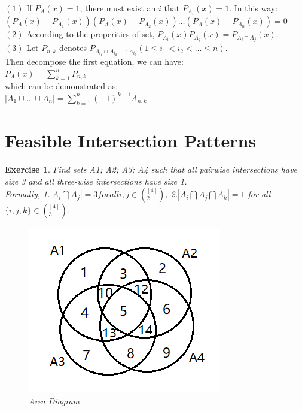 \documentclass[12pt,a4]{article}
\theoremstyle{exercise}
\newtheorem{exercise}[theorem]{Exercise}
\begin{document}
\begin{enumerate}
    $(1)$ If $P_A(x) = 1$, there must exist an $i$ that $P_{A_i}(x) = 1$. In this way:\\
    $(P_A(x) - P_{A_1}(x))(P_A(x) - P_{A_2}(x))\ldots(P_A(x) - P_{A_n}(x)) = 0$\\

    $(2)$ According to the properities of set, $P_{A_i}(x)P_{A_j}(x) = P_{A_i \cap A_j}(x)$.\\

    $(3)$ Let $P_{n,k}$ denotes $P_{A_{i_1}\cap A_{i_2}\ldots\cap A_{i_k}}(1\le i_1<i_2<\ldots\le n)$.\\
    Then decompose the first equation, we can have:\\
    $P_A(x) = \sum\limits_{k=1}^{n}P_{n,k}$\\
    which can be demonstrated as:\\
     $\left\vert{A_1\cup\ldots\cup A_n}\right\vert = \sum\limits_{k=1}^{n}(-1)^{k+1}A_{n,k}$\\
\end{enumerate}

\section{Feasible Intersection Patterns}


\begin{exercise}  Find sets A1; A2; A3; A4 such that all pairwise intersections have size 3 and all three-wise intersections have size 1. \\Formally,
 1.$|A_i\bigcap A_j| = 3 for all {i,j} \in (^{[4]}_{2})$,
 2.$|A_i\bigcap A_j\bigcap A_k| = 1$ for all $\{i,j,k\}\in (^{[4]}_{3})$.

    \begin{figure}[H]
	\begin{center}
		\includegraphics[width=0.32\linewidth]{Exercise31-1.png}
		\caption{Area Diagram}
		\label{Fig:1}
	\end{center}
	\vspace{-0.5em}
    \end{figure}

\end{exercise}
\end{document}
